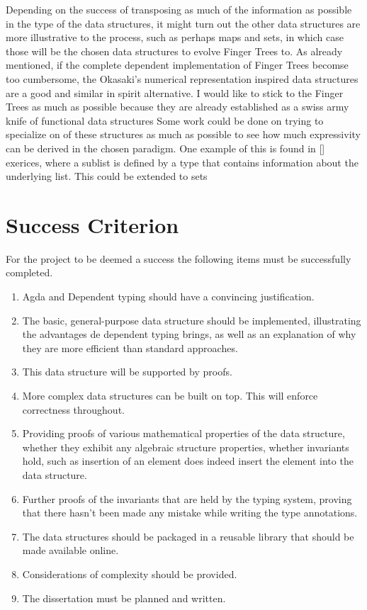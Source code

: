 \documentclass[12pt]{article}
\begin{document}
Depending on the success of transposing as much of the information as possible
in the type of the data structures, it might turn out the other data structures
are more illustrative to the process, such as perhaps maps and sets, in which
case those will be the chosen data structures to evolve Finger Trees to.
As already mentioned, if the complete dependent implementation of Finger Trees
becomse too cumbersome, the Okasaki's numerical representation inspired
data structures are a good and similar in spirit alternative. I would like to
stick to the Finger Trees as much as possible because they are already established
as a swiss army knife of functional data structures
Some work could be done on trying to specialize on of these structures as much
as possible to see how much expressivity can be derived in the chosen paradigm.
One example of this is found in [] exerices, where a sublist is defined by a
type that contains information about the underlying list. This could be extended
to sets

\section*{Success Criterion}

For the project to be deemed a success the following items must be
successfully completed.

\begin{enumerate}

\item Agda and Dependent typing should have a convincing justification.

\item The basic, general-purpose data structure should be implemented, illustrating
the advantages de dependent typing brings, as well as an explanation of why they
are more efficient than standard approaches.

\item This data structure will be supported by proofs.

\item More complex data structures can be built on top. This will enforce
correctness throughout.

\item Providing proofs of various mathematical properties of the data structure,
whether they exhibit any algebraic structure properties, whether invariants hold,
such as insertion of an element does indeed insert the element into the data structure.

\item Further proofs of the invariants that are held by the typing system, proving
that there hasn't been made any mistake while writing the type annotations.

\item The data structures should be packaged in a reusable library that should be
made available online.

\item Considerations of complexity should be provided.

\item The dissertation must be planned and written.

\end{enumerate}
\end{document}
